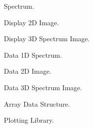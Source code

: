 \documentclass[12pt, titlepage]{article}
\newcounter{mnum}
\newcommand{\mthemnum}{M\themnum}
\begin{document}
\begin{description}
Spectrum.
	\item [\refstepcounter{mnum} \mthemnum \label{m2Dimgdisplay}:] Display 2D
Image.
	\item [\refstepcounter{mnum} \mthemnum \label{m3DSIdisplay}:] Display 3D
Spectrum Image.
	\item [\refstepcounter{mnum} \mthemnum \label{m1Dspecdata}:] Data 1D Spectrum.
	\item [\refstepcounter{mnum} \mthemnum \label{m2Dimgdata}:] Data 2D Image.
	\item [\refstepcounter{mnum} \mthemnum \label{m3DSIdata}:] Data 3D Spectrum
Image.
	\item [\refstepcounter{mnum} \mthemnum \label{mArrayStruct}:] Array Data
Structure. 
	\item [\refstepcounter{mnum} \mthemnum \label{mPlotLib}:] Plotting Library.
\end{description}
\end{document}
